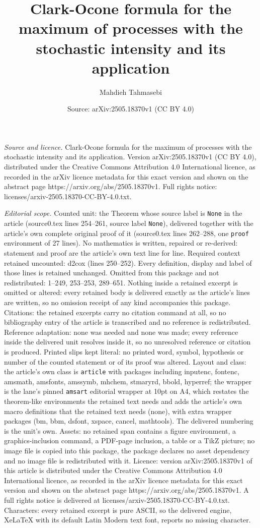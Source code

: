 \documentclass[10pt,a4paper]{amsart}
\title[Clark-Ocone formula for the maximum of processes with the st]{Clark-Ocone formula for the maximum of processes with the stochastic intensity and its application}
\author{Mahdieh Tahmasebi}
\date{Source: arXiv:2505.18370v1 (CC BY 4.0)}
\begin{document}
\maketitle

\noindent\emph{Source and licence.} Clark-Ocone formula for the maximum of processes with the stochastic intensity and its application. Version arXiv:2505.18370v1 (CC BY 4.0), distributed under the Creative Commons Attribution 4.0 International licence, as recorded in the arXiv licence metadata for this exact version and shown on the abstract page https://arxiv.org/abs/2505.18370v1. Full rights notice: licenses/arxiv-2505.18370-CC-BY-4.0.txt.\par\smallskip

\noindent\textit{Editorial scope.} Counted unit: the Theorem whose source label is \texttt{None} in the article (source0.tex lines 254--261, source label \texttt{None}), delivered together with the article's own complete original proof of it (source0.tex lines 262--288, one \texttt{proof} environment of 27 lines). No mathematics is written, repaired or re-derived: statement and proof are the article's own text line for line. Required context retained uncounted: d2cox (lines 250--252). Every definition, display and label of those lines is retained unchanged. Omitted from this package and not redistributed: 1--249, 253--253, 289--651. Nothing inside a retained excerpt is omitted or altered: every retained body is delivered exactly as the article's lines are written, so no omission receipt of any kind accompanies this package. Citations: the retained excerpts carry no citation command at all, so no bibliography entry of the article is transcribed and no reference is redistributed. Reference adaptation: none was needed and none was made; every reference inside the delivered unit resolves inside it, so no unresolved reference or citation is produced. Printed slips kept literal: no printed word, symbol, hypothesis or number of the counted statement or of its proof was altered. Layout and class: the article's own class is \texttt{article} with packages including inputenc, fontenc, amsmath, amsfonts, amssymb, mhchem, stmaryrd, bbold, hyperref; the wrapper is the lane's pinned \texttt{amsart} editorial wrapper at 10pt on A4, which restates the theorem-like environments the retained text needs and adds the article's own macro definitions that the retained text needs (none), with extra wrapper packages (bm, bbm, dsfont, xspace, cancel, mathtools). The delivered numbering is the unit's own. Assets: no retained span contains a figure environment, a graphics-inclusion command, a PDF-page inclusion, a table or a TikZ picture; no image file is copied into this package, the package declares no asset dependency and no image file is redistributed with it. Licence: version arXiv:2505.18370v1 of this article is distributed under the Creative Commons Attribution 4.0 International licence, as recorded in the arXiv licence metadata for this exact version and shown on the abstract page https://arxiv.org/abs/2505.18370v1. A full rights notice is delivered at licenses/arxiv-2505.18370-CC-BY-4.0.txt. Characters: every retained excerpt is pure ASCII, so the delivered engine, XeLaTeX with its default Latin Modern text font, reports no missing character.
\end{document}
